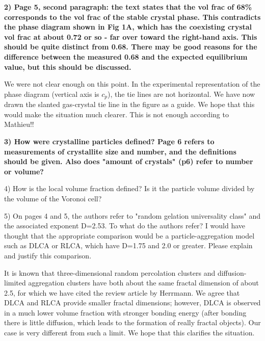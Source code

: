 \documentclass[11pt]{article}
\begin{document}
\vspace{1em}

\singlespacing

{\bf
2) Page 5, second paragraph: the text states that the vol frac of 68\% corresponds to the vol frac of the stable crystal phase. This contradicts the phase diagram shown in Fig 1A, which has the coexisting crystal vol frac at about 0.72 or so - far over toward the right-hand axis. This should be quite distinct from 0.68. There may be good reasons for the difference between the measured 0.68 and the expected equilibrium value, but this should be discussed.
}




\bigskip
\doublespacing

We were not clear enough on this point. In the experimental representation of the phase diagram (vertical axis is $c_p$), the tie lines are not horizontal. We have now drawn the slanted gas-crystal tie line in the figure as a guide. We hope that this would make the situation much clearer. This is not enough according to Mathieu!!


\vspace{1em}

\singlespacing

{\bf
3) How were crystalline particles defined? Page 6 refers to measurements of crystallite size and number, and the definitions should be given. Also does "amount of crystals" (p6) refer to number or volume?



4) How is the local volume fraction defined? Is it the particle volume divided by the volume of the Voronoi cell?



5) On pages 4 and 5, the authors refer to "random gelation universality class" and the associated exponent D=2.53. To what do the authors refer? I would have thought that the appropriate comparison would be a particle-aggregation model such as DLCA or RLCA, which have D=1.75 and 2.0 or greater. Please explain and justify this comparison.
}




\bigskip
\doublespacing

It is known that three-dimensional random percolation clusters and diffusion-limited aggregation clusters have both about the same fractal dimension of about 2.5, for which we have cited the review article by Herrmann. We agree that DLCA and RLCA provide smaller fractal dimensions; however, DLCA is observed in a much lower volume fraction with stronger bonding energy (after bonding there is little diffusion, which leads to the formation of really fractal objects). Our case is very different from such a limit. We hope that this clarifies the situation.
\end{document}
